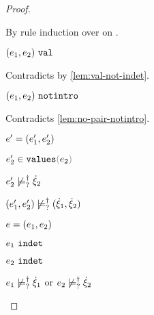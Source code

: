 \begin{proof}
\begin{byCases}
\begin{byCases}
\begin{byCases}
\begin{byCases}
\begin{pfsteps*}
          \end{pfsteps*}
          By rule induction over  on .
          \begin{byCases}
            \item[\text{(\ref{rule:IVVal})}]
            \begin{pfsteps*}
            \item $(e_1 , e_2) ~\mathtt{val}$ 
            \end{pfsteps*} 
            Contradicts  by \autoref{lem:val-not-indet}.
            \item[\text{(\ref{rule:IVIndet})}] 
            \begin{pfsteps*}
            \item $(e_1 , e_2) ~\mathtt{notintro}$ 
            \end{pfsteps*}
            Contradicts \autoref{lem:no-pair-notintro}.
            \item[\text{(\ref{rule:IVPair})}]
            \begin{pfsteps*}
            \item $e'=(e_1' , e_2')$ 
            \item $\inValues{e_2'}{e_2}$  
            \item $e_2' \not\models_{?}^{\dag} \dot{\xi}_2$  
            \item $(e_1' , e_2') \not\models_{?}^{\dag} (\dot{\xi}_1 , \dot{\xi}_2)$ 
            \end{pfsteps*} 
          \end{byCases}
        \end{byCases}
      \end{byCases}
      \item[\text{(\ref{rule:IPair})}] 
      \begin{pfsteps*}
      \item $e=(e_1 , e_2)$ 
      \item $e_1 ~\mathtt{indet}$  
      \item $e_2 ~\mathtt{indet}$  
      \item $e_1 \not\models_{?}^{\dag} \dot{\xi}_1$ or $e_2 \not\models_{?}^{\dag} \dot{\xi}_2$  

\end{pfsteps*}
\end{byCases}
\end{byCases}
\end{proof}

